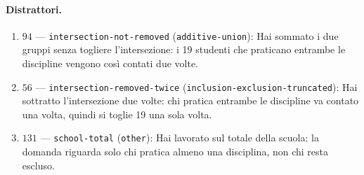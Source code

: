 \paragraph{Distrattori.}
\begin{enumerate}
  \item $94$ --- \texttt{intersection-not-removed} (\texttt{additive-union}): Hai sommato i due gruppi senza togliere l'intersezione: i 19 studenti che praticano entrambe le discipline vengono così contati due volte.
  \item $56$ --- \texttt{intersection-removed-twice} (\texttt{inclusion-exclusion-truncated}): Hai sottratto l'intersezione due volte: chi pratica entrambe le discipline va contato una volta, quindi si toglie 19 una sola volta.
  \item $131$ --- \texttt{school-total} (\texttt{other}): Hai lavorato sul totale della scuola: la domanda riguarda solo chi pratica almeno una disciplina, non chi resta escluso.
\end{enumerate}


